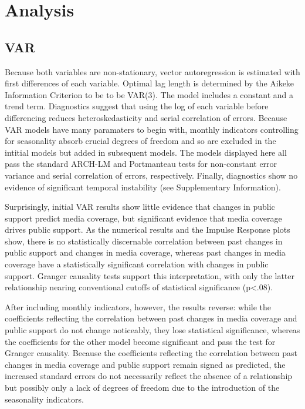 \documentclass[12pt,article]{article}
\begin{document}
\section{Analysis}\label{analysis}

\subsection{VAR}\label{var}

Because both variables are non-stationary, vector autoregression is
estimated with first differences of each variable. Optimal lag length is
determined by the Aikeke Information Criterion to be to be VAR(3). The
model includes a constant and a trend term. Diagnostics suggest that
using the log of each variable before differencing reduces
heteroskedasticity and serial correlation of errors. Because VAR models
have many paramaters to begin with, monthly indicators controlling for
seasonality absorb crucial degrees of freedom and so are excluded in the
intitial models but added in subsequent models. The models displayed
here all pass the standard ARCH-LM and Portmanteau tests for
non-constant error variance and serial correlation of errors,
respectively. Finally, diagnostics show no evidence of significant
temporal instability (see Supplementary Information).

Surprisingly, initial VAR results show little evidence that changes in
public support predict media coverage, but significant evidence that
media coverage drives public support. As the numerical results and the
Impulse Response plots show, there is no statistically discernable
correlation between past changes in public support and changes in media
coverage, whereas past changes in media coverage have a statistically
significant correlation with changes in public support. Granger
causality tests support this interpretation, with only the latter
relationship nearing conventional cutoffs of statistical significance
(p\textless{}.08).

After including monthly indicators, however, the results reverse: while
the coefficients reflecting the correlation between past changes in
media coverage and public support do not change noticeably, they lose
statistical significance, whereas the coefficients for the other model
become significant and pass the test for Granger causality. Because the
coefficients reflecting the correlation between past changes in media
coverage and public support remain signed as predicted, the increased
standard errors do not necessarily reflect the absence of a relationship
but possibly only a lack of degrees of freedom due to the introduction
of the seasonality indicators.
\end{document}
